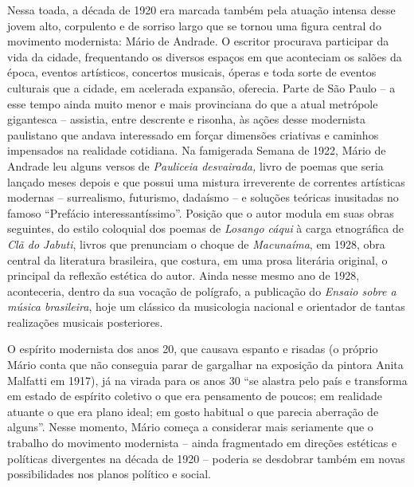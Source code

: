 Nessa toada, a década de 1920 era marcada também pela atuação intensa
desse jovem alto, corpulento e de sorriso largo que se tornou uma figura
central do movimento modernista: Mário de Andrade. O escritor procurava
participar da vida da cidade, frequentando os diversos espaços em que
aconteciam os salões da época, eventos artísticos, concertos musicais,
óperas e toda sorte de eventos culturais que a cidade, em acelerada
expansão, oferecia. Parte de São Paulo -- a esse tempo ainda muito menor
e mais provinciana do que a atual metrópole gigantesca -- assistia,
entre descrente e risonha, às ações desse modernista paulistano que
andava interessado em forçar dimensões criativas e caminhos impensados
na realidade cotidiana. Na famigerada Semana de 1922, Mário de Andrade
leu alguns versos de \emph{Pauliceia desvairada,} livro de poemas que
seria lançado meses depois e que possui uma mistura irreverente de
correntes artísticas modernas -- surrealismo, futurismo, dadaísmo -- e
soluções teóricas inusitadas no famoso ``Prefácio interessantíssimo''.
Posição que o autor modula em suas obras seguintes, do estilo coloquial
dos poemas de \emph{Losango cáqui} à carga etnográfica de \emph{Clã do
Jabuti}, livros que prenunciam o choque de \emph{Macunaíma}, em 1928,
obra central da literatura brasileira, que costura, em uma prosa
literária original, o principal da reflexão estética do autor. Ainda
nesse mesmo ano de 1928, aconteceria, dentro da sua vocação de
polígrafo, a publicação do \emph{Ensaio sobre a música brasileira}, hoje
um clássico da musicologia nacional e orientador de tantas realizações
musicais posteriores.

O espírito modernista dos anos 20, que causava espanto e risadas (o
próprio Mário conta que não conseguia parar de gargalhar na exposição da
pintora Anita Malfatti em 1917), já na virada para os anos 30 ``se
alastra pelo país e transforma em estado de espírito coletivo o que era
pensamento de poucos; em realidade atuante o que era plano ideal; em
gosto habitual o que parecia aberração de alguns''. Nesse momento, Mário
começa a considerar mais seriamente que o trabalho do movimento
modernista -- ainda fragmentado em direções estéticas e políticas
divergentes na década de 1920 -- poderia se desdobrar também em novas
possibilidades nos planos político e social.

